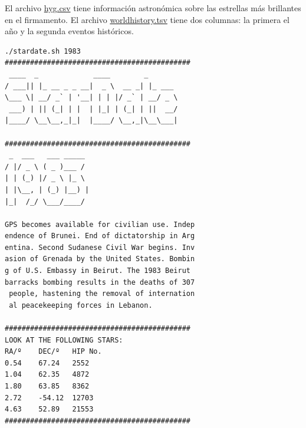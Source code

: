 \documentclass[11pt,letterpaper]{exam}
\begin{document}
\begin{questions}

El archivo \href{http://www.google.com}{hyg.csv} tiene información astronómica sobre las estrellas más brillantes en el firmamento. El archivo \href{http://www.google.com}{worldhistory.tsv} tiene dos columnas: la primera el año y la segunda eventos históricos.


\begin{verbatim}
./stardate.sh 1983
############################################
 ____  _             ____        _       
/ ___|| |_ __ _ _ __|  _ \  __ _| |_ ___ 
\___ \| __/ _` | '__| | | |/ _` | __/ _ \
 ___) | || (_| | |  | |_| | (_| | ||  __/
|____/ \__\__,_|_|  |____/ \__,_|\__\___|
                                         
############################################
 _  ___   ___ _____ 
/ |/ _ \ ( _ )___ / 
| | (_) |/ _ \ |_ \ 
| |\__, | (_) |__) |
|_|  /_/ \___/____/ 
                    
GPS becomes available for civilian use. Indep
endence of Brunei. End of dictatorship in Arg
entina. Second Sudanese Civil War begins. Inv
asion of Grenada by the United States. Bombin
g of U.S. Embassy in Beirut. The 1983 Beirut 
barracks bombing results in the deaths of 307
 people, hastening the removal of internation
 al peacekeeping forces in Lebanon.

############################################
LOOK AT THE FOLLOWING STARS:
RA/º    DEC/º   HIP No.
0.54    67.24   2552  
1.04    62.35   4872  
1.80    63.85   8362  
2.72    -54.12  12703 
4.63    52.89   21553 
############################################
\end{verbatim}

\end{questions}
\end{document}
